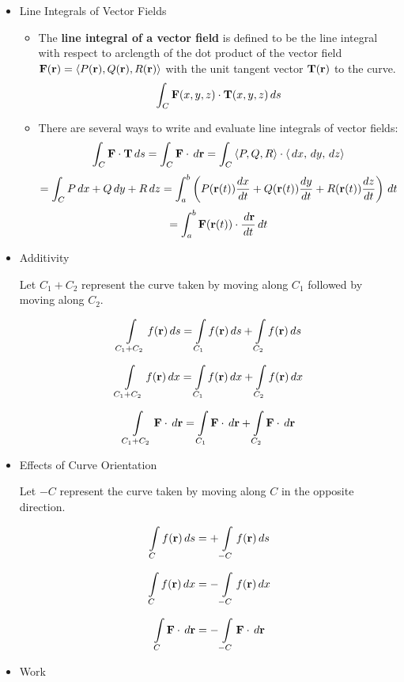 \begin{itemize}
  \item Line Integrals of Vector Fields

    \begin{itemize}
    \item The \textbf{line integral of a vector field} is defined to be the line integral with respect to arclength of the dot product of the vector field $\mathbf{F}(\mathbf{r})=\left<P(\mathbf{r}),Q(\mathbf{r}),R(\mathbf{r})\right>$ with the unit tangent vector $\mathbf{T}(\mathbf{r})$ to the curve.
      \[
        \int_C \mathbf{F}(x,y,z)\cdot\mathbf{T}(x,y,z)\,d{s}
      \]
    \item There are several ways to write and evaluate line integrals of vector fields:
      \[
        \int_C \mathbf{F}\cdot\mathbf{T}\,d{s} = \int_C \mathbf{F}\cdot\,d{\mathbf{r}} = \int_C \left<P,Q,R\right>\cdot\left<\,d{x},\,d{y},\,d{z}\right>
      \]
      \[
        = \int_C P\,d{x}+Q\,d{y}+R\,d{z} = \int_a^b \left(P(\mathbf{r}(t))\frac{dx}{dt}+Q(\mathbf{r}(t))\frac{dy}{dt}+R(\mathbf{r}(t))\frac{dz}{dt}\right)\,d{t}
      \]
      \[
        = \int_a^b \mathbf{F}(\mathbf{r}(t))\cdot\frac{\,d{\mathbf{r}}}{dt}\,d{t}
      \]
    \end{itemize}
    
  \item Additivity

  Let $C_1+C_2$ represent the curve taken by moving along $C_1$ followed by moving along $C_2$.

   \[\int\limits_{C_1+C_2} f(\mathbf{r})\,d{s}=\int\limits_{C_1}f(\mathbf{r})\,d{s}+\int\limits_{C_2}f(\mathbf{r})\,d{s}\]

   \[\int\limits_{C_1+C_2} f(\mathbf{r})\,d{x}=\int\limits_{C_1}f(\mathbf{r})\,d{x}+\int\limits_{C_2}f(\mathbf{r})\,d{x}\]

   \[\int\limits_{C_1+C_2} \mathbf{F}\cdot\,d{\mathbf{r}}=\int\limits_{C_1}\mathbf{F}\cdot\,d{\mathbf{r}}+\int\limits_{C_2}\mathbf{F}\cdot\,d{\mathbf{r}}\]

  \item Effects of Curve Orientation

  Let $-C$ represent the curve taken by moving along $C$ in the opposite direction.

  \[\int\limits_{C} f(\mathbf{r})\,d{s} = +\int\limits_{-C} f(\mathbf{r})\,d{s}\]

  \[\int\limits_{C} f(\mathbf{r})\,d{x} = -\int\limits_{-C} f(\mathbf{r})\,d{x}\]

  \[\int\limits_{C} \mathbf{F}\cdot\,d{\mathbf{r}} = -\int\limits_{-C} \mathbf{F}\cdot\,d{\mathbf{r}}\]

  \item Work


\end{itemize}
